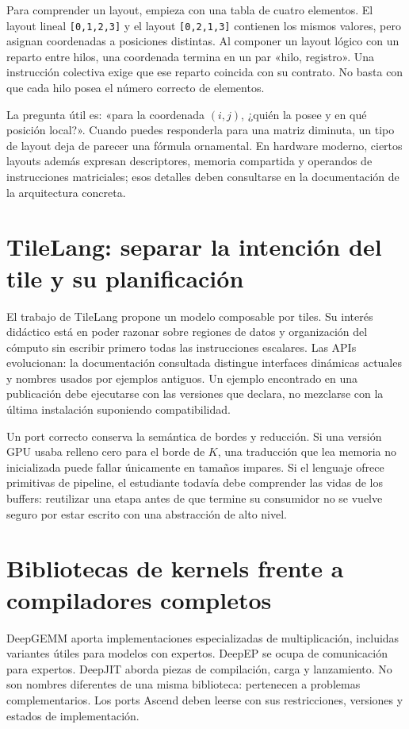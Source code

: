 \documentclass[12pt,a4paper,oneside]{report}
\begin{document}
Para comprender un layout, empieza con una tabla de cuatro elementos. El layout lineal \texttt{[0,1,2,3]} y el layout \texttt{[0,2,1,3]} contienen los mismos valores, pero asignan coordenadas a posiciones distintas. Al componer un layout lógico con un reparto entre hilos, una coordenada termina en un par «hilo, registro». Una instrucción colectiva exige que ese reparto coincida con su contrato. No basta con que cada hilo posea el número correcto de elementos.

La pregunta útil es: «para la coordenada $(i,j)$, ¿quién la posee y en qué posición local?». Cuando puedes responderla para una matriz diminuta, un tipo de layout deja de parecer una fórmula ornamental. En hardware moderno, ciertos layouts además expresan descriptores, memoria compartida y operandos de instrucciones matriciales; esos detalles deben consultarse en la documentación de la arquitectura concreta. \cite{ptx,cutlass}

\section{TileLang: separar la intención del tile y su planificación}
El trabajo de TileLang propone un modelo composable por tiles. Su interés didáctico está en poder razonar sobre regiones de datos y organización del cómputo sin escribir primero todas las instrucciones escalares. Las APIs evolucionan: la documentación consultada distingue interfaces dinámicas actuales y nombres usados por ejemplos antiguos. Un ejemplo encontrado en una publicación debe ejecutarse con las versiones que declara, no mezclarse con la última instalación suponiendo compatibilidad. \cite{tilelang-paper,tilelang-doc}

Un port correcto conserva la semántica de bordes y reducción. Si una versión GPU usaba relleno cero para el borde de $K$, una traducción que lea memoria no inicializada puede fallar únicamente en tamaños impares. Si el lenguaje ofrece primitivas de pipeline, el estudiante todavía debe comprender las vidas de los buffers: reutilizar una etapa antes de que termine su consumidor no se vuelve seguro por estar escrito con una abstracción de alto nivel.

\section{Bibliotecas de kernels frente a compiladores completos}
DeepGEMM aporta implementaciones especializadas de multiplicación, incluidas variantes útiles para modelos con expertos. DeepEP se ocupa de comunicación para expertos. DeepJIT aborda piezas de compilación, carga y lanzamiento. No son nombres diferentes de una misma biblioteca: pertenecen a problemas complementarios. Los ports Ascend deben leerse con sus restricciones, versiones y estados de implementación. \cite{deepgemm,deepep,deepjit,deepgemm-ascend,deepep-ascend}
\end{document}
